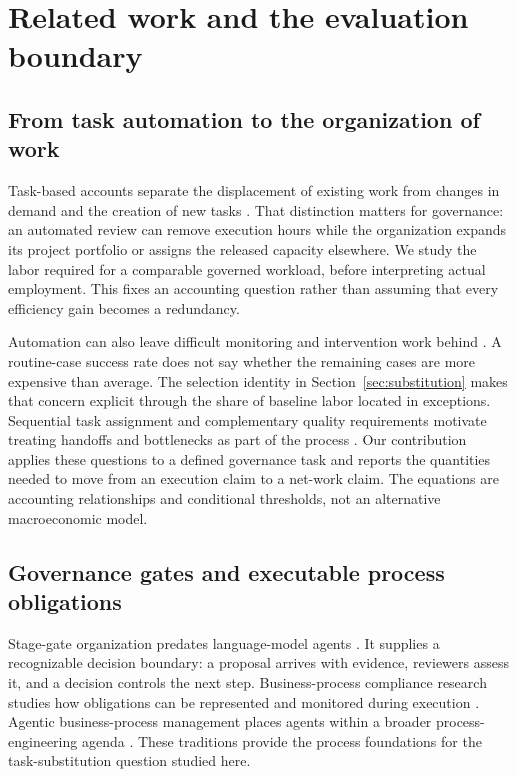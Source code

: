 \section{Related work and the evaluation boundary}
\label{sec:related}

\subsection{From task automation to the organization of work}

Task-based accounts separate the displacement of existing work from changes in demand and
the creation of new tasks \citep{acemoglu2019}. That distinction matters for governance:
an automated review can remove execution hours while the organization expands its project
portfolio or assigns the released capacity elsewhere. We study the labor required for a
comparable governed workload, before interpreting actual employment. This fixes an accounting
question rather than assuming that every efficiency gain becomes a redundancy.

Automation can also leave difficult monitoring and intervention work behind
\citep{bainbridge1983}. A routine-case success rate does not say whether the remaining cases
are more expensive than average. The selection identity in Section~\ref{sec:substitution}
makes that concern explicit through the share of baseline labor located in exceptions.
Sequential task assignment and complementary quality requirements motivate treating handoffs
and bottlenecks as part of the process \citep{demirer2026,gans2026}. Our contribution applies
these questions to a defined governance task and reports the quantities needed to move from
an execution claim to a net-work claim. The equations are accounting relationships and
conditional thresholds, not an alternative macroeconomic model.

\subsection{Governance gates and executable process obligations}

Stage-gate organization predates language-model agents \citep{cooper1990}. It supplies a
recognizable decision boundary: a proposal arrives with evidence, reviewers assess it, and
a decision controls the next step. Business-process compliance research studies how obligations
can be represented and monitored during execution \citep{ly2015}. Agentic business-process
management places agents within a broader process-engineering agenda \citep{calvanese2026}.
These traditions provide the process foundations for the task-substitution question studied here.

